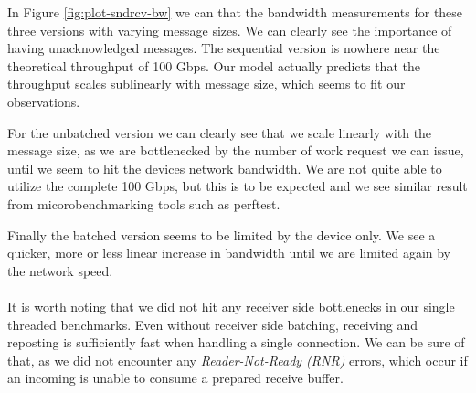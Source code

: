 In Figure \ref{fig:plot-sndrcv-bw} we can that the bandwidth measurements for these three versions with varying message
sizes. We can clearly see the importance of having unacknowledged messages. The sequential version is nowhere near the
theoretical throughput of 100 Gbps. Our model actually predicts that the throughput scales sublinearly with message size,
which seems to fit our observations.

For the unbatched version we can clearly see that we scale linearly with the message size, as we are bottlenecked by 
the number of work request we can issue, until we seem to hit the devices network bandwidth. We are not quite able to
utilize the complete 100 Gbps, but this is to be expected and we see similar result from micorobenchmarking tools such
as perftest.

Finally the batched version seems to be limited by the device only. We see a quicker, more or less linear increase in 
bandwidth until we are limited again by the network speed.


\paragraph{} It is worth noting that we did not hit any receiver side bottlenecks in our single threaded benchmarks.
Even without receiver side batching, receiving and reposting is sufficiently fast when handling a single connection.
We can be sure of that, as we did not encounter any \emph{Reader-Not-Ready (RNR)} errors, which occur if an incoming
is unable to consume a prepared receive buffer.


